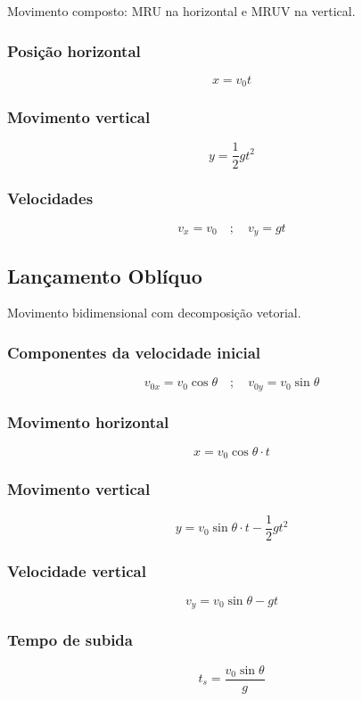 \documentclass[a4paper,12pt]{article}
\begin{document}
Movimento composto: MRU na horizontal e MRUV na vertical.

\subsubsection{Posição horizontal}
\[
x = v_0 t
\]

\subsubsection{Movimento vertical}
\[
y = \frac{1}{2}gt^2
\]

\subsubsection{Velocidades}
\[
v_x = v_0 \quad ; \quad v_y = gt
\]

\subsection{Lançamento Oblíquo}

Movimento bidimensional com decomposição vetorial.

\subsubsection{Componentes da velocidade inicial}
\[
v_{0x} = v_0 \cos\theta \quad ; \quad v_{0y} = v_0 \sin\theta
\]

\subsubsection{Movimento horizontal}
\[
x = v_0 \cos\theta \cdot t
\]

\subsubsection{Movimento vertical}
\[
y = v_0 \sin\theta \cdot t - \frac{1}{2}gt^2
\]

\subsubsection{Velocidade vertical}
\[
v_y = v_0 \sin\theta - gt
\]

\subsubsection{Tempo de subida}
\[
t_s = \frac{v_0 \sin\theta}{g}
\]
\end{document}
